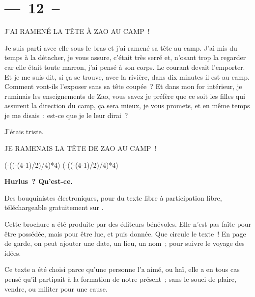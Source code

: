 \documentclass[french,twoside]{book} %
\newcommand{\dateline}[1]{\medskip{\RaggedLeft{#1}\par}\bigskip}
\def\truncdiv#1#2{((#1-(#2-1)/2)/#2)}
\def\moduloop#1#2{(#1-\truncdiv{#1}{#2}*#2)}
\def\modulo#1#2{\number\numexpr\moduloop{#1}{#2}\relax}
\begin{document}
\section[{— 12 –}]{— 12 –}\renewcommand{\leftmark}{— 12 –}

\noindent J’AI RAMENÉ LA TÊTE À ZAO AU CAMP !\par
\bigbreak
\noindent Je suis parti avec elle sous le bras et j’ai ramené sa tête au camp. J’ai mis du temps à la détacher, je vous assure, c’était très serré et, n’osant trop la regarder car elle était toute marron, j’ai pensé à son corps. Le courant devait l’emporter. Et je me suis dit, si ça se trouve, avec la rivière, dans dix minutes il est au camp. Comment vont-ils l’exposer sans sa tête coupée ? Et dans mon for intérieur, je ruminais les enseignements de Zao, vous savez je préfère que ce soit les filles qui assurent la direction du camp, ça sera mieux, je vous promets, et en même temps je me disais : est-ce que je le leur dirai ?\par
J’étais triste.\par
\bigbreak
\noindent JE RAMENAIS LA TÊTE DE ZAO AU CAMP !\par

\dateline{Lille, octobre 2016}
 


\ifbooklet
  \pagestyle{empty}
  \clearpage
  \ifnum\modulo{\value{page}}{4}=0 \hbox{}\newpage\hbox{}\newpage\fi
  \ifnum\modulo{\value{page}}{4}=1 \hbox{}\newpage\hbox{}\newpage\fi


  \hbox{}\newpage
  \ifodd\value{page}\hbox{}\newpage\fi
  {\centering\color{rubric}\bfseries\noindent\large
    Hurlus ? Qu’est-ce.\par
    \bigskip
  }
  \noindent Des bouquinistes électroniques, pour du texte libre à participation libre,
  téléchargeable gratuitement sur \href{https://hurlus.fr}{}.\par
  \bigskip
  \noindent Cette brochure a été produite par des éditeurs bénévoles.
  Elle n’est pas faîte pour être possédée, mais pour être lue, et puis donnée.
  Que circule le texte !
  En page de garde, on peut ajouter une date, un lieu, un nom ; pour suivre le voyage des idées.
  \par

  Ce texte a été choisi parce qu’une personne l’a aimé,
  ou haï, elle a en tous cas pensé qu’il partipait à la formation de notre présent ;
  sans le souci de plaire, vendre, ou militer pour une cause.
  \par
\end{document}

